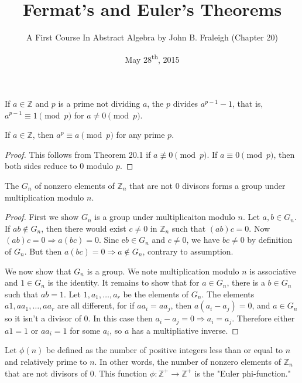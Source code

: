 \documentclass[a4paper,11pt]{article}
\title{Fermat's and Euler's Theorems}
\author{A First Course In Abstract Algebra by John B. Fraleigh (Chapter 20)}
\date{May 28\textsuperscript{th}, 2015}
\begin{document}
\maketitle
{}

\begin{outline}

    If \(a \in \mathbb{Z}\) and \(p\) is a prime not dividing \(a\),
    the \(p\) divides \(a^{p-1}-1\), that is, \(a^{p-1} \equiv 1 \pmod{p}\) for \(a \neq 0 \pmod{p}\).
      
    If \(a \in \mathbb{Z}\), then \(a^p \equiv a \pmod{p}\) for any prime \(p\).
    
    \begin{proof}
      This follows from Theorem 20.1 if \(a \not\equiv 0 \pmod{p}\). If \(a \equiv 0 \pmod{p}\), then
      both sides reduce to \(0\) modulo \(p\).
    \end{proof}
    
    The \(G_n\) of nonzero elements of \(\mathbb{Z}_n\) that are not \(0\) divisors forms a group
    under multiplication modulo \(n\).
    
    \begin{proof}
      First we show \(G_n\) is a group under multiplicaiton modulo \(n\). Let \(a, b \in G_n\). If \(ab \not\in G_n\),
      then there would exist \(c \neq 0\) in \(\mathbb{Z}_n\) such that \((ab)c = 0\). Now \((ab)c = 0 \Rightarrow a(bc)
      = 0\). Sinc e\(b \in G_n\) and \(c \neq 0\), we have \(bc \neq 0\) by definition of \(G_n\). But then \(a(bc) = 0
      \Rightarrow a \not\in G_n\), contrary to assumption.
      
      We now show that \(G_n\) is a group. We note multiplication modulo \(n\) is associative and \(1 \in G_n\) is the
      identity. It remains to show that for \(a \in G_n\), there is a \(b \in G_n\) such that \(ab = 1\). Let \(1, a_1,
      \ldots, a_r\) be the elements of \(G_n\). The elements \(a1, aa_1, \ldots, aa_r\) are all different, for if \(aa_i
      = aa_j\), then \(a(a_i-a_j) = 0\), and \(a \in G_n\) so it isn't a divisor of \(0\). In this case then \(a_i-a_j = 0
      \Rightarrow a_i = a_j\). Therefore either \(a1 = 1\) or \(aa_i = 1\) for some \(a_i\), so \(a\) has a multipliative
      inverse.
    \end{proof}
      
    Let \(\phi(n)\) be defined as the number of positive integers less than or equal to \(n\) and relatively prime 
    to \(n\). In other words, the number of nonzero elements of \(\mathbb{Z}_n\) that are not divisors 
    of \(0\). This function \(\phi: \mathbb{Z}^{+} \rightarrow \mathbb{Z}^{+}\) is the "Euler phi-function."


\end{outline}
\end{document}
